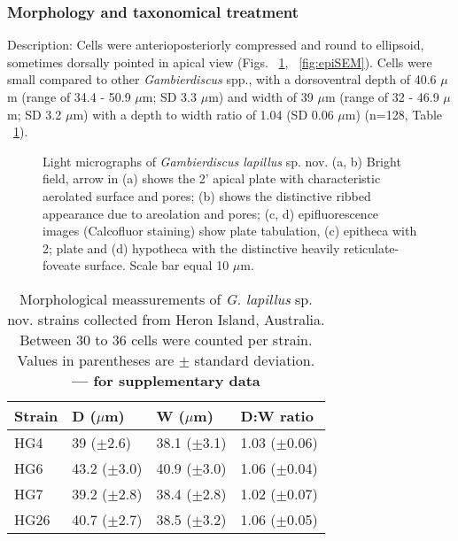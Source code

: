 \documentclass[12pt]{article}
\begin{document}
\subsubsection{Morphology and taxonomical treatment}
\FloatBarrier
Description: Cells were anterioposteriorly compressed and round to ellipsoid, sometimes dorsally pointed in apical view (Figs. ~\ref{fig:PetLM}, ~\ref{fig:epiSEM}). 
Cells were small compared to other \textit{Gambierdiscus} spp., with a dorsoventral depth of 40.6 $\mu$m (range of 34.4 - 50.9 $\mu$m; SD 3.3 $\mu$m) and width of 39 $\mu$m (range of 32 - 46.9 $\mu$m; SD 3.2 $\mu$m) with a depth to width ratio of 1.04 (SD 0.06 $\mu$m) (n=128, Table ~\ref{tbl:SizeTable}). 
 
\begin{figure} 
\caption{Light micrographs of \textit{Gambierdiscus lapillus} sp. nov. (a, b) Bright field, arrow in (a) shows the 2' apical plate with characteristic aerolated surface and pores; (b) shows the distinctive ribbed appearance due to areolation and pores; (c, d) epifluorescence images (Calcofluor staining) show plate tabulation, (c) epitheca with 2; plate and (d) hypotheca with the distinctive heavily reticulate-foveate surface. Scale bar equal 10 $\mu$m.​} 
\label{fig:PetLM}
\end{figure} 


\begin{table}
\caption{Morphological meassurements of \emph{G. lapillus }sp. nov. strains collected from Heron Island, Australia. Between 30 to 36 cells were counted per strain. Values in parentheses are $\pm$ standard deviation. \textbf{--- for supplementary data}}
\label{tbl:SizeTable}
\begin{tabular}{ | p{2cm} | p{2.5cm} | p{2.5cm} | p{2.5cm} | }
\hline
 \textbf{Strain} & \textbf{D ($\mu$m)} & \textbf{W ($\mu$m)}  & \textbf{D:W ratio}  \\
 \hline
 HG4  & 39 ($\pm$2.6) & 38.1 ($\pm$3.1) & 1.03 ($\pm$0.06) \\

 HG6  & 43.2 ($\pm$3.0) & 40.9 ($\pm$3.0) & 1.06 ($\pm$0.04)  \\

 HG7  & 39.2 ($\pm$2.8) & 38.4 ($\pm$2.8) & 1.02 ($\pm$0.07)  \\

 HG26  & 40.7 ($\pm$2.7) & 38.5 ($\pm$3.2) & 1.06 ($\pm$0.05) \\
 \hline
\end{tabular}
\end{table}
\end{document}
